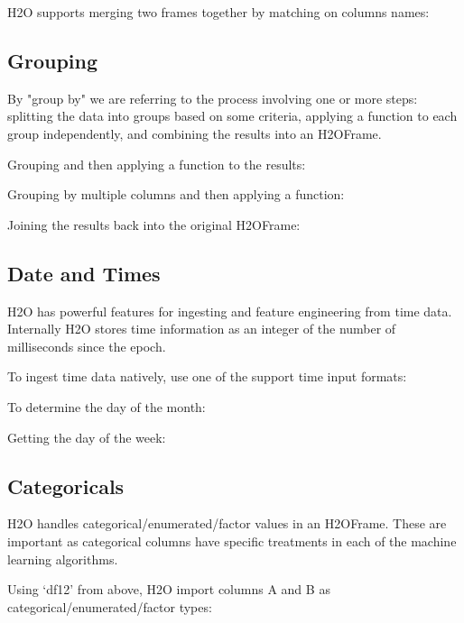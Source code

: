 H2O supports merging two frames together by matching on columns names:


\subsection{Grouping}
By "group by" we are referring to the process involving one or more steps: splitting the
data into groups based on some criteria, applying a function to each group independently,
and combining the results into an H2OFrame.

Grouping and then applying a function to the results:


Grouping by multiple columns and then applying a function:


Joining the results back into the original H2OFrame:


\subsection{Date and Times}
H2O has powerful features for ingesting and feature engineering from time data.  Internally H2O
stores time information as an integer of the number of milliseconds since the epoch.

To ingest time data natively, use one of the support time input formats:


To determine the day of the month:


Getting the day of the week:


\subsection{Categoricals}
H2O handles categorical/enumerated/factor values in an H2OFrame.  These are important as categorical
columns have specific treatments in each of the machine learning algorithms.

Using `df12' from above, H2O import columns A and B as categorical/enumerated/factor types:


